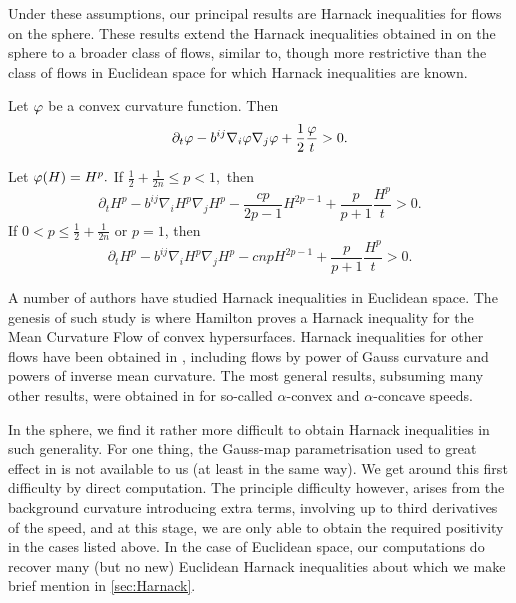 \documentclass{amsart}
\begin{document}
Under these assumptions, our principal results are Harnack inequalities for flows on the sphere. These results extend the Harnack inequalities obtained in \cite{2015arXiv150802821B, bryanlouie} on the sphere to a broader class of flows, similar to, though more restrictive than the class of flows in Euclidean space \cite{MR1296393} for which Harnack inequalities are known.

\begin{theorem}\label{thm:harnack}
Let $\varphi$ be a  convex curvature function. Then
\[
\partial_t \varphi-b^{ij}\nabla_i\varphi\nabla_j\varphi+\frac{1}{2}\frac{\varphi}{t}>0.
\]

Let $\varphi(H)=H^{p}.$ If $\frac{1}{2}+\frac{1}{2n}\leq {p}< 1,$ then
\[
\partial_t H^{p} - b^{ij}\nabla_iH^{p}\nabla_jH^{p} - \frac{c {p}}{2{p}-1}H^{2{p}-1} + \frac{{p}}{{p}+1} \frac{H^{p}}{t} > 0.
\]
If $0<{p}\leq \frac{1}{2} + \frac{1}{2n}$ or $p=1$, then
\[
\partial_t H^{p} - b^{ij}\nabla_iH^{p}\nabla_jH^{p} - c n{p}H^{2{p}-1} + \frac{{p}}{{p}+1} \frac{H^{p}}{t} > 0.
\]
\end{theorem}

A number of authors have studied Harnack inequalities in Euclidean space. The genesis of such study is \cite{MR1316556} where Hamilton proves a Harnack inequality for the Mean Curvature Flow of convex hypersurfaces. Harnack inequalities for other flows have been obtained in \cite{MR1100812, MR2813400, MR1480081}, including flows by power of Gauss curvature and powers of inverse mean curvature. The most general results, subsuming many other results, were obtained in \cite{MR1296393} for so-called \(\alpha\)-convex and \(\alpha\)-concave speeds.

In the sphere, we find it rather more difficult to obtain Harnack inequalities in such generality. For one thing, the Gauss-map parametrisation used to great effect in \cite{MR1296393} is not available to us (at least in the same way). We get around this first difficulty by direct computation. The principle difficulty however, arises from the background curvature introducing extra terms, involving up to third derivatives of the speed, and at this stage, we are only able to obtain the required positivity in the cases listed above. In the case of Euclidean space, our computations do recover many (but no new) Euclidean Harnack inequalities about which we make brief mention in \cref{sec:Harnack}.
\end{document}
